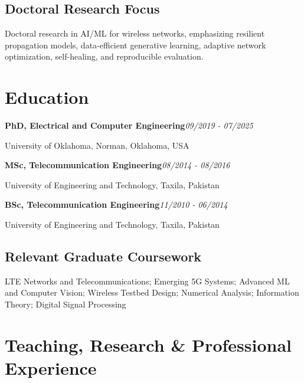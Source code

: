 \documentclass[9pt,letterpaper]{extarticle}
\newcommand{\entry}[2]{\Needspace{4\baselineskip}\textbf{#1}\hfill\textit{#2}\par}
\begin{document}
\subsection{Doctoral Research Focus}
Doctoral research in AI/ML for wireless networks, emphasizing resilient propagation models, data-efficient generative learning, adaptive network optimization, self-healing, and reproducible evaluation.\par
{}
\section{Education}
\entry{PhD, Electrical and Computer Engineering}{09/2019 - 07/2025}
University of Oklahoma, Norman, Oklahoma, USA\par
\entry{MSc, Telecommunication Engineering}{08/2014 - 08/2016}
University of Engineering and Technology, Taxila, Pakistan\par
\entry{BSc, Telecommunication Engineering}{11/2010 - 06/2014}
University of Engineering and Technology, Taxila, Pakistan\par
{}
\subsection{Relevant Graduate Coursework}
LTE Networks and Telecommunications; Emerging 5G Systems; Advanced ML and Computer Vision; Wireless Testbed Design; Numerical Analysis; Information Theory; Digital Signal Processing\par
{}
\section{Teaching, Research \& Professional Experience}
\end{document}
